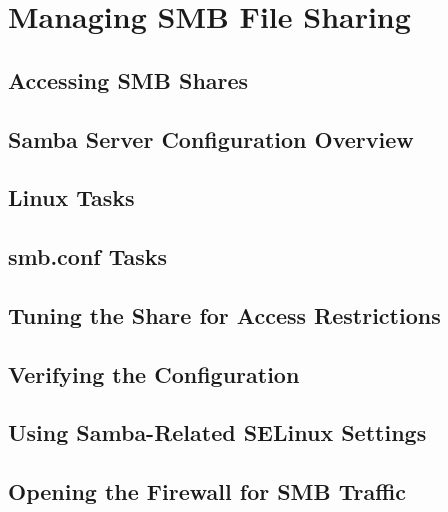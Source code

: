 \chapter{Managing SMB File Sharing}

\section{Accessing SMB Shares}


\section{Samba Server Configuration Overview}
\section{Linux Tasks}
\section{smb.conf Tasks}
\section{Tuning the Share for Access Restrictions}
\section{Verifying the Configuration}
\section{Using Samba-Related SELinux Settings}
\section{Opening the Firewall for SMB Traffic}